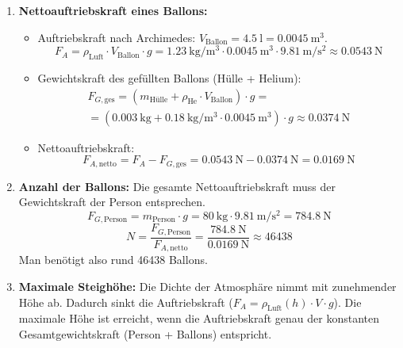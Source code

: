 \documentclass[ngerman]{scrreprt}
\newenvironment{loesungbox}[1]
  {\needspace{5\baselineskip}\begin{loesungboxstyle}[frametitle={#1}]}
  {\end{loesungboxstyle}}
\begin{document}
\begin{loesungbox}{Lösung zu \Cref{aufg:heliumballons}}
\begin{enumerate}
    \item \textbf{Nettoauftriebskraft eines Ballons:}
    \begin{itemize}
        \item Auftriebskraft nach Archimedes: $V_{\text{Ballon}} = \SI{4.5}{\litre} = \SI{0.0045}{\metre\cubed}$.
        \begin{equation}\label{eq: ballon_auftrieb}
            F_A = \rho_{\text{Luft}} \cdot V_{\text{Ballon}} \cdot g = \SI{1.23}{\kg\per\m\cubed} \cdot \SI{0.0045}{\m\cubed} \cdot \SI{9.81}{\m\per\s\squared} \approx \SI{0.0543}{\newton}
        \end{equation}
        \item Gewichtskraft des gefüllten Ballons (Hülle + Helium):
        \begin{multline}\label{eq: ballon_gewicht}
            F_{G,\text{ges}} = (m_{\text{Hülle}} + \rho_{\text{He}} \cdot V_{\text{Ballon}}) \cdot g = \\
            =(\SI{0.003}{\kg} + \SI{0.18}{\kg\per\m\cubed} \cdot \SI{0.0045}{\m\cubed}) \cdot g \approx \SI{0.0374}{\newton}
        \end{multline}
        \item Nettoauftriebskraft:
        \begin{equation}\label{eq: ballon_netto}
            F_{A,\text{netto}} = F_A - F_{G,\text{ges}} = \SI{0.0543}{\newton} - \SI{0.0374}{\newton} = \SI{0.0169}{\newton}
        \end{equation}
    \end{itemize}
    \item \textbf{Anzahl der Ballons:} Die gesamte Nettoauftriebskraft muss der Gewichtskraft der Person entsprechen.
    \begin{equation}\label{eq: ballon_person_gewicht}
        F_{G,\text{Person}} = m_{\text{Person}} \cdot g = \SI{80}{\kg} \cdot \SI{9.81}{\m\per\s\squared} = \SI{784.8}{\newton}
    \end{equation}
    \begin{equation}\label{eq: ballon_anzahl}
        N = \frac{F_{G,\text{Person}}}{F_{A,\text{netto}}} = \frac{\SI{784.8}{\newton}}{\SI{0.0169}{\newton}} \approx 46438
    \end{equation}
    Man benötigt also rund 46438 Ballons.
    \item \textbf{Maximale Steighöhe:} Die Dichte der Atmosphäre nimmt mit zunehmender Höhe ab. Dadurch sinkt die Auftriebskraft ($F_A = \rho_{\text{Luft}}(h) \cdot V \cdot g$). Die maximale Höhe ist erreicht, wenn die Auftriebskraft genau der konstanten Gesamtgewichtskraft (Person + Ballons) entspricht.

\end{enumerate}
\end{loesungbox}
\end{document}
